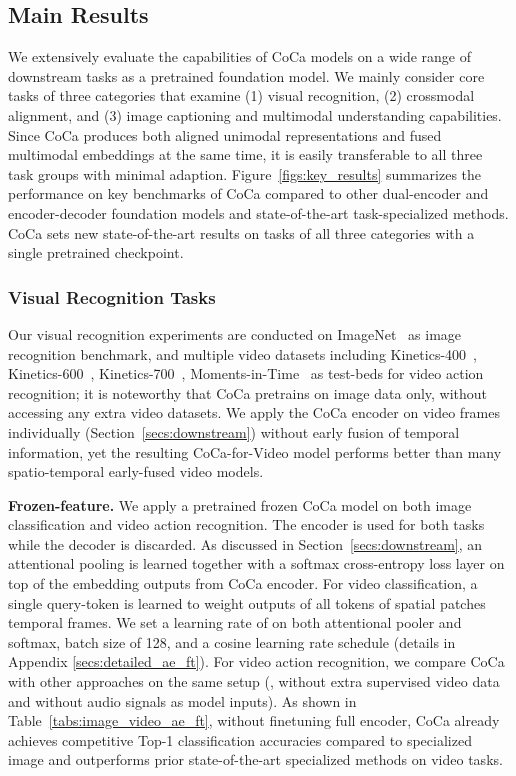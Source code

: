 \subsection{Main Results}
\label{secs:main_results}
We extensively evaluate the capabilities of CoCa models on a wide range of downstream tasks as a pretrained foundation model.
We mainly consider core tasks of three categories that examine (1) visual recognition, (2) crossmodal alignment, and (3) image captioning and multimodal understanding capabilities.
Since CoCa produces both aligned unimodal representations and fused multimodal embeddings at the same time,
it is easily transferable to all three task groups with minimal adaption.
Figure~\ref{figs:key_results} summarizes the performance on key benchmarks of CoCa compared to other dual-encoder and encoder-decoder foundation models and state-of-the-art task-specialized methods. CoCa sets new state-of-the-art results on tasks of all three categories with a single pretrained checkpoint.


\subsubsection{Visual Recognition Tasks}
\label{secs:visual_recognition}
Our visual recognition experiments are conducted on ImageNet~\cite{deng2009imagenet} as image recognition benchmark, and multiple video datasets including Kinetics-400~\cite{kay2017kinetics}, Kinetics-600~\cite{carreira2018short}, Kinetics-700~\cite{carreira2019short}, Moments-in-Time~\cite{monfort2019moments} as test-beds for video action recognition; it is noteworthy that CoCa pretrains on image data only, without accessing any extra video datasets. We apply the CoCa encoder on video frames individually (Section~\ref{secs:downstream}) without early fusion of temporal information, yet the resulting CoCa-for-Video model performs better than many spatio-temporal early-fused video models. 

\textbf{Frozen-feature.} We apply a pretrained frozen CoCa model on both image classification and video action recognition. The encoder is used for both tasks while the decoder is discarded. As discussed in Section~\ref{secs:downstream}, an attentional pooling is learned together with a softmax cross-entropy loss layer on top of the embedding outputs from CoCa encoder. For video classification, a single query-token is learned to weight outputs of all tokens of spatial patches  temporal frames. We set a learning rate of  on both attentional pooler and softmax, batch size of 128, and a cosine learning rate schedule (details in Appendix \ref{secs:detailed_ae_ft}). For video action recognition, we compare CoCa with other approaches on the same setup (\ie, without extra supervised video data and without audio signals as model inputs).
As shown in Table~\ref{tabs:image_video_ae_ft}, without finetuning full encoder,
CoCa already achieves competitive Top-1 classification accuracies compared to specialized image and outperforms prior state-of-the-art specialized methods on video tasks.


